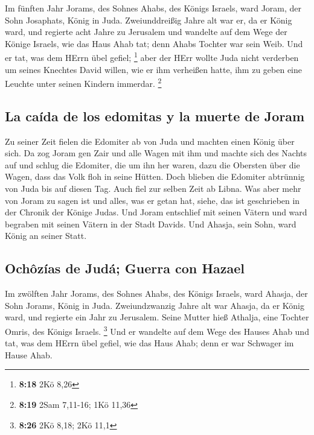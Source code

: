  Im fünften Jahr Jorams, des Sohnes Ahabs, des Königs
Israels, ward Joram, der Sohn Josaphats, König in Juda. 
Zweiunddreißig Jahre alt war er, da er König ward, und regierte acht
Jahre zu Jerusalem  und wandelte auf dem Wege der Könige
Israels, wie das Haus Ahab tat; denn Ahabs Tochter war sein Weib. Und er
tat, was dem HErrn übel gefiel; \footnote{\textbf{8:18} 2Kö 8,26}
 aber der HErr wollte Juda nicht verderben um seines
Knechtes David willen, wie er ihm verheißen hatte, ihm zu geben eine
Leuchte unter seinen Kindern immerdar. \footnote{\textbf{8:19} 2Sam
  7,11-16; 1Kö 11,36}

\hypertarget{la-cauxedda-de-los-edomitas-y-la-muerte-de-joram}{%
\subsection{La caída de los edomitas y la muerte de
Joram}\label{la-cauxedda-de-los-edomitas-y-la-muerte-de-joram}}

 Zu seiner Zeit fielen die Edomiter ab von Juda und
machten einen König über sich.  Da zog Joram gen Zair und
alle Wagen mit ihm und machte sich des Nachts auf und schlug die
Edomiter, die um ihn her waren, dazu die Obersten über die Wagen, dass
das Volk floh in seine Hütten.  Doch blieben die Edomiter
abtrünnig von Juda bis auf diesen Tag. Auch fiel zur selben Zeit ab
Libna.  Was aber mehr von Joram zu sagen ist und alles,
was er getan hat, siehe, das ist geschrieben in der Chronik der Könige
Judas.  Und Joram entschlief mit seinen Vätern und ward
begraben mit seinen Vätern in der Stadt Davids. Und Ahasja, sein Sohn,
ward König an seiner Statt.

\hypertarget{ochuxf4zuxedas-de-juduxe1-guerra-con-hazael}{%
\subsection{Ochôzías de Judá; Guerra con
Hazael}\label{ochuxf4zuxedas-de-juduxe1-guerra-con-hazael}}

 Im zwölften Jahr Jorams, des Sohnes Ahabs, des Königs
Israels, ward Ahasja, der Sohn Jorams, König in Juda. 
Zweiundzwanzig Jahre alt war Ahasja, da er König ward, und regierte ein
Jahr zu Jerusalem. Seine Mutter hieß Athalja, eine Tochter Omris, des
Königs Israels. \footnote{\textbf{8:26} 2Kö 8,18; 2Kö 11,1}
 Und er wandelte auf dem Wege des Hauses Ahab und tat,
was dem HErrn übel gefiel, wie das Haus Ahab; denn er war Schwager im
Hause Ahab.

